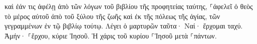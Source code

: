 \documentclass{openreader}
\begin{document}
καὶ ἐάν τις ἀφέλῃ ἀπὸ τῶν λόγων τοῦ βιβλίου τῆς προφητείας ταύτης, ⸀ἀφελεῖ ὁ θεὸς τὸ μέρος αὐτοῦ ἀπὸ τοῦ ξύλου τῆς ζωῆς καὶ ἐκ τῆς πόλεως τῆς ἁγίας, τῶν γεγραμμένων ἐν τῷ βιβλίῳ τούτῳ. 
Λέγει ὁ μαρτυρῶν ταῦτα· Ναί· ἔρχομαι ταχύ. Ἀμήν· ⸀ἔρχου, κύριε Ἰησοῦ. 
Ἡ χάρις τοῦ κυρίου ⸀Ἰησοῦ μετὰ ⸀πάντων. 
\end{document}
